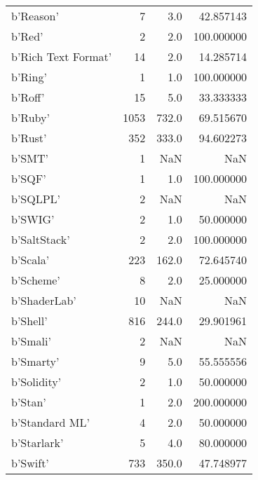 \begin{table}
\begin{tabular}{lrrr}
b'Reason'                   &               7 &       3.0 &      42.857143 \\
b'Red'                      &               2 &       2.0 &     100.000000 \\
b'Rich Text Format'         &              14 &       2.0 &      14.285714 \\
b'Ring'                     &               1 &       1.0 &     100.000000 \\
b'Roff'                     &              15 &       5.0 &      33.333333 \\
b'Ruby'                     &            1053 &     732.0 &      69.515670 \\
b'Rust'                     &             352 &     333.0 &      94.602273 \\
b'SMT'                      &               1 &       NaN &            NaN \\
b'SQF'                      &               1 &       1.0 &     100.000000 \\
b'SQLPL'                    &               2 &       NaN &            NaN \\
b'SWIG'                     &               2 &       1.0 &      50.000000 \\
b'SaltStack'                &               2 &       2.0 &     100.000000 \\
b'Scala'                    &             223 &     162.0 &      72.645740 \\
b'Scheme'                   &               8 &       2.0 &      25.000000 \\
b'ShaderLab'                &              10 &       NaN &            NaN \\
b'Shell'                    &             816 &     244.0 &      29.901961 \\
b'Smali'                    &               2 &       NaN &            NaN \\
b'Smarty'                   &               9 &       5.0 &      55.555556 \\
b'Solidity'                 &               2 &       1.0 &      50.000000 \\
b'Stan'                     &               1 &       2.0 &     200.000000 \\
b'Standard ML'              &               4 &       2.0 &      50.000000 \\
b'Starlark'                 &               5 &       4.0 &      80.000000 \\
b'Swift'                    &             733 &     350.0 &      47.748977 \\

\end{tabular}
\end{table}
